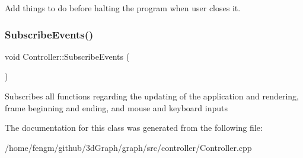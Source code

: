 Add things to do before halting the program when user closes it. \mbox{\label{class_controller_a94c58a56f3af5ab155ae425494ba996a}} 
\subsubsection{\texorpdfstring{SubscribeEvents()}{SubscribeEvents()}}
{\footnotesize\ttfamily void Controller\+::\+Subscribe\+Events (\begin{DoxyParamCaption}{ }\end{DoxyParamCaption})\hspace{0.3cm}{\ttfamily [inline]}}

Subscribes all functions regarding the updating of the application and rendering, frame beginning and ending, and mouse and keyboard inputs 

The documentation for this class was generated from the following file\+:\begin{DoxyCompactItemize}
\item 
/home/fengm/github/3d\+Graph/graph/src/controller/Controller.\+cpp\end{DoxyCompactItemize}
